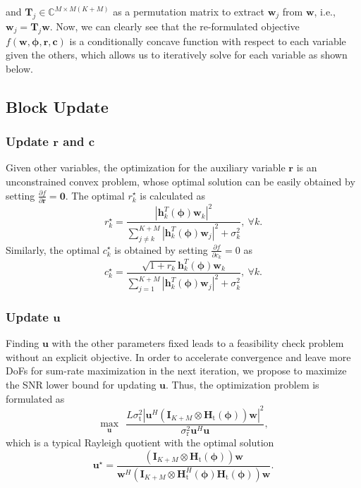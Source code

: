 \documentclass[Conference,a4paper]{IEEEtran}
\newcommand{\be}{\begin{equation}}
\newcommand{\ee}{\end{equation}}
\begin{document}
\noindent and $\mathbf{T}_j\in\mathbb{C}^{M\times M(K+M)}$ as a permutation matrix to extract $\mathbf{w}_j$ from $\mathbf{w}$, i.e., $\mathbf{w}_j = \mathbf{T}_j\mathbf{w}$.
Now, we can clearly see that the re-formulated objective $f(\mathbf{w},\bm{\phi},\mathbf{r},\mathbf{c})$ is a conditionally concave function with respect to each variable given the others, which allows us to iteratively solve for each variable as shown below.

\vspace{-0.2 cm}
\subsection{Block Update}

\subsubsection{Update $\mathbf{r}$ and $\mathbf{c}$}

Given other variables, the optimization for the auxiliary variable $\mathbf{r}$ is an unconstrained convex problem, whose optimal solution can be easily obtained by setting $\frac{\partial f}{\partial\mathbf{r}} = \mathbf{0}$.
The optimal $r_k^\star$ is calculated as
\be\label{eq:update rk}
r_k^\star = \frac{|\mathbf{h}^T_k(\bm{\phi})\mathbf{w}_k|^2}
{\sum_{j\neq k}^{K+M}|\mathbf{h}^T_k(\bm{\phi})\mathbf{w}_j|^2+\sigma_k^2},~\forall k.
\ee
Similarly, the optimal $c_k^\star$ is obtained by setting $\frac{\partial f}{\partial c_k} = 0$ as
\be\label{eq:update ck}
c_k^\star = \frac{\sqrt{1+r_k}\mathbf{h}^T_k(\bm{\phi})\mathbf{w}_k}{\sum_{j=1}^{K+M}|\mathbf{h}^T_k(\bm{\phi})\mathbf{w}_j|^2
+\sigma_k^2},~\forall k.
\ee

\subsubsection{Update $\mathbf{u}$}


Finding $\mathbf{u}$ with the other parameters fixed leads to a feasibility check problem without an explicit objective.
In order to accelerate convergence and leave more DoFs for sum-rate maximization in the next iteration, we propose to maximize the SNR lower bound for updating $\mathbf{u}$.
Thus, the optimization problem is formulated as
\be\label{eq:u problem}
\underset{\mathbf{u}}\max~~\frac{L\sigma^2_\text{t}|\mathbf{u}^H(\mathbf{I}_{K+M}\otimes\mathbf{H}_\text{t}(\bm{\phi}))\mathbf{w}|^2}
{\sigma_\text{r}^2\mathbf{u}^H\mathbf{u}},
\ee
which is a typical Rayleigh quotient with the optimal solution
\be\label{eq:update u}
\mathbf{u}^\star = \frac{(\mathbf{I}_{K+M}\otimes\mathbf{H}_\text{t}(\bm{\phi}))\mathbf{w}}
{\mathbf{w}^H(\mathbf{I}_{K+M}\otimes\mathbf{H}^H_\text{t}(\bm{\phi})\mathbf{H}_\text{t}(\bm{\phi}))\mathbf{w}}.
\ee
\end{document}
